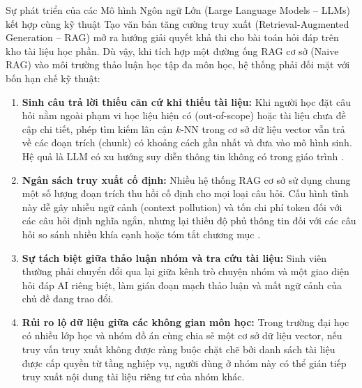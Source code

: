 \documentclass{IEEEtran}
\begin{document}
Sự phát triển của các Mô hình Ngôn ngữ Lớn (Large Language Models -- LLMs) kết hợp cùng kỹ thuật Tạo văn bản tăng cường truy xuất (Retrieval-Augmented Generation -- RAG) \cite{lewis2020rag, gao2023rag} mở ra hướng giải quyết khả thi cho bài toán hỏi đáp trên kho tài liệu học phần. Dù vậy, khi tích hợp một đường ống RAG cơ sở (Naive RAG) vào môi trường thảo luận học tập đa môn học, hệ thống phải đối mặt với bốn hạn chế kỹ thuật:
\begin{enumerate}
    \item \textbf{Sinh câu trả lời thiếu căn cứ khi thiếu tài liệu:} Khi người học đặt câu hỏi nằm ngoài phạm vi học liệu hiện có (out-of-scope) hoặc tài liệu chưa đề cập chi tiết, phép tìm kiếm lân cận $k$-NN trong cơ sở dữ liệu vector vẫn trả về các đoạn trích (chunk) có khoảng cách gần nhất và đưa vào mô hình sinh. Hệ quả là LLM có xu hướng suy diễn thông tin không có trong giáo trình \cite{huang2025survey}.
    \item \textbf{Ngân sách truy xuất cố định:} Nhiều hệ thống RAG cơ sở sử dụng chung một số lượng đoạn trích thu hồi cố định cho mọi loại câu hỏi. Cấu hình tĩnh này dễ gây nhiễu ngữ cảnh (context pollution) và tốn chi phí token đối với các câu hỏi định nghĩa ngắn, nhưng lại thiếu độ phủ thông tin đối với các câu hỏi so sánh nhiều khía cạnh hoặc tóm tắt chương mục \cite{jeong2024adaptiverag}.
    \item \textbf{Sự tách biệt giữa thảo luận nhóm và tra cứu tài liệu:} Sinh viên thường phải chuyển đổi qua lại giữa kênh trò chuyện nhóm và một giao diện hỏi đáp AI riêng biệt, làm gián đoạn mạch thảo luận và mất ngữ cảnh của chủ đề đang trao đổi.
    \item \textbf{Rủi ro lộ dữ liệu giữa các không gian môn học:} Trong trường đại học có nhiều lớp học và nhóm đồ án cùng chia sẻ một cơ sở dữ liệu vector, nếu truy vấn truy xuất không được ràng buộc chặt chẽ bởi danh sách tài liệu được cấp quyền từ tầng nghiệp vụ, người dùng ở nhóm này có thể gián tiếp truy xuất nội dung tài liệu riêng tư của nhóm khác.
\end{enumerate}
\end{document}
